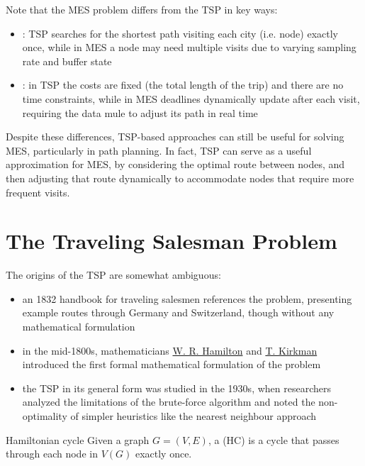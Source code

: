 \documentclass[a4paper, 12pt]{report}
\begin{document}
    Note that the MES problem differs from the TSP in key ways:
    
    \begin{itemize}
        \item {}: TSP searches for the shortest path visiting each city (i.e. node) exactly once, while in MES a node may need multiple visits due to varying sampling rate and buffer state
        \item {}: in TSP the costs are fixed (the total length of the trip) and there are no time constraints, while in MES deadlines dynamically update after each visit, requiring the data mule to adjust its path in real time
    \end{itemize}

    Despite these differences, TSP-based approaches can still be useful for solving MES, particularly in path planning. In fact, TSP can serve as a useful approximation for MES, by considering the optimal route between nodes, and then adjusting that route dynamically to accommodate nodes that require more frequent visits.

    \section{The Traveling Salesman Problem}

    The origins of the TSP are somewhat ambiguous:

    \begin{itemize}
        \item an 1832 handbook for traveling salesmen references the problem, presenting example routes through Germany and Switzerland, though without any mathematical formulation
        \item in the mid-1800s, mathematicians \href{https://en.wikipedia.org/wiki/William_Rowan_Hamilton}{W. R. Hamilton} and \href{https://en.wikipedia.org/wiki/Thomas_Kirkman}{T. Kirkman} introduced the first formal mathematical formulation of the problem
        \item the TSP in its general form was studied in the 1930s, when researchers analyzed the limitations of the brute-force algorithm and noted the non-optimality of simpler heuristics like the nearest neighbour approach
    \end{itemize}

    \begin{frameddefn}{Hamiltonian cycle}
        Given a graph $G = (V,E)$, a  (HC) is a cycle that passes through each node in $V(G)$ exactly once.
    \end{frameddefn}
\end{document}
